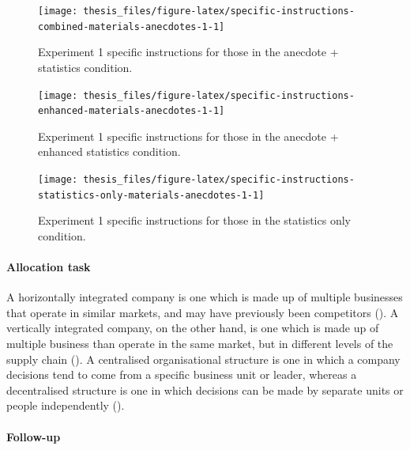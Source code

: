 \documentclass[a4paper, nobind, dvipsnames]{templates/ociamthesis}
\theoremstyle{definition}
\theoremstyle{definition}
\theoremstyle{definition}
\theoremstyle{definition}
\theoremstyle{remark}
\begin{document}
\begin{figure}
\texttt{[image: thesis\_files/figure-latex/specific-instructions-combined-materials-anecdotes-1-1]} \caption{Experiment 1 specific instructions for those in the anecdote + statistics condition.}\label{fig:specific-instructions-combined-materials-anecdotes-1}
\end{figure}



\begin{figure}
\texttt{[image: thesis\_files/figure-latex/specific-instructions-enhanced-materials-anecdotes-1-1]} \caption{Experiment 1 specific instructions for those in the anecdote + enhanced statistics condition.}\label{fig:specific-instructions-enhanced-materials-anecdotes-1}
\end{figure}



\begin{figure}
\texttt{[image: thesis\_files/figure-latex/specific-instructions-statistics-only-materials-anecdotes-1-1]} \caption{Experiment 1 specific instructions for those in the statistics only condition.}\label{fig:specific-instructions-statistics-only-materials-anecdotes-1}
\end{figure}

\hypertarget{allocation-materials-anecdotes-1}{%
\paragraph{Allocation task}\label{allocation-materials-anecdotes-1}}

A horizontally integrated company is one which is made up of multiple businesses
that operate in similar markets, and may have previously been competitors
(\textcite{gaughan2012}). A vertically integrated company, on the other hand, is one which
is made up of multiple business than operate in the same market, but in
different levels of the supply chain (\textcite{gaughan2012a}). A centralised
organisational structure is one in which a company decisions tend to come from a
specific business unit or leader, whereas a decentralised structure is one in
which decisions can be made by separate units or people independently
(\textcite{kenton2021}).

\hypertarget{follow-up-materials-anecdotes-1}{%
\paragraph{Follow-up}\label{follow-up-materials-anecdotes-1}}
\end{document}
